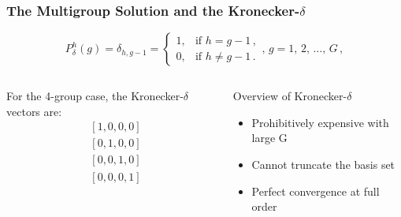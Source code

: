 \documentclass[fleqn]{beamer}
\begin{document}
  \begin{frame}
      \frametitle{The Multigroup Solution and the Kronecker-$\delta$}
      \begin{equation*}
          P_{\delta}^h(g) = \delta_{h, g-1} = 
          \begin{cases}
              1, & \text{if }  h = g-1 \, , \\
              0, & \text{if }  h \neq g-1 \, .
          \end{cases}
          ,\, g=1,\, 2, \, \ldots,\, G \, ,
      \end{equation*}
      \begin{columns}[T]
          \begin{column}{0.5\textwidth}
              For the 4-group case, the Kronecker-$\delta$ vectors are:
              \begin{equation*}
                  \begin{split}
                      &[1,0,0,0] \\
                      &[0,1,0,0] \\
                      &[0,0,1,0] \\
                      &[0,0,0,1]
                  \end{split}
              \end{equation*}
          \end{column}
          \begin{column}{0.5\textwidth}
              \begin{block}{Overview of Kronecker-$\delta$}
                  \begin{itemize}
                      \item Prohibitively expensive with large G
                      \item Cannot truncate the basis set
                      \item Perfect convergence at full order
                  \end{itemize}
              \end{block}
          \end{column}
      \end{columns}
  \end{frame}
\end{document}
